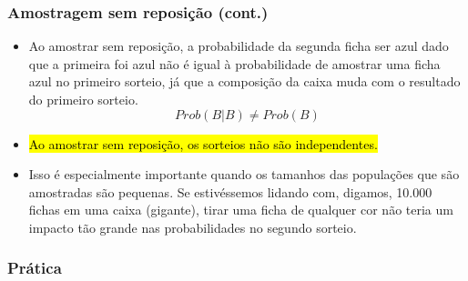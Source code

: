 \begin{frame}
\frametitle{Amostragem sem reposição (cont.)}

\begin{itemize}
\justifying
\item Ao amostrar sem reposição, a probabilidade da segunda ficha ser azul dado que a primeira foi azul não é igual à probabilidade de amostrar uma ficha azul no primeiro sorteio, já que a composição da caixa muda com o resultado do primeiro sorteio.
\[ Prob(B | B) \ne Prob(B) \]

\pause
\justifying
\item \hl{Ao amostrar sem reposição, os sorteios não são independentes.}

\pause
\justifying
\item Isso é especialmente importante quando os tamanhos das populações que são amostradas são pequenas. Se estivéssemos lidando com, digamos, 10.000 fichas em uma caixa (gigante), tirar uma ficha de qualquer cor não teria um impacto tão grande nas probabilidades no segundo sorteio.

\end{itemize}

\end{frame}


\begin{frame}
\frametitle{Prática}
\justifying
{}

{
\soln{
\pause
\[ P(ás~então~3) = \frac{4}{52} \times \frac{4}{51} \approx 0.0060 \]
}}

\end{frame}


